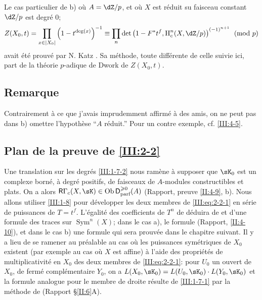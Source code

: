Le cas particulier de b) où $A=\dZ/p$, et où $X$ est réduit su faisceau 
constant $\dZ/p$ est degré $0$;
\[
  Z(X_0,t) = \prod_{x\in |X_0|} \left(1-t^{\deg(x)}\right)^{-1}
      \equiv \prod_n \det\left(1-F^* t^f,\h_c^n(X,\dZ/p)\right)^{(-1)^{n+1}} \pmod p
\]
avait été prouvé par N. Katz \cite[XXII 3.1]{sga7}. Sa méthode, toute 
différente de celle suivie ici, part de la théorie $p$-adique de Dwork de 
$Z(X_0,t)$. 





\subsection{Remarque}\label{III:2-7}


Contrairement à ce que j'avais imprudemment affirmé à des amis, on ne 
peut pas dans b) omettre l'hypothèse ``$A$ réduit.'' Pour un contre 
exemple, cf. \ref{III:4-5}. 





\subsection{Plan de la preuve de \ref{III:2-2}}\label{III:2-8}

Une translation sur les degrés \ref{III:1-7-2} nous ramène à supposer 
que $\sK_0$ est un complexe borné, à degré positifs, de faisceaux de 
$A$-modules constructibles et plats. On a alors 
$\R\Gamma_c(X,\sK)\in \ob\D_\text{parf}^{\geqslant 0}(A)$ (Rapport, 
preuve \ref{II:4-9}, b). Nous allons utiliser \ref{III:1-8} pour développer 
les deux membres de \eqref{III:eq:2-2-1} en série de puissances de $T=t^f$. 
L'égalité des coefficients de $T^n$ de déduira de 
\cite[XVII 5.5.21]{sga4} et d'une formule des traces sur 
$\operatorname{Sym}^n(X)$; dans le cas a), le formule (Rapport, 
\ref{II:4-10}), et dans le cas b) une formule qui sera prouvée dans le 
chapitre suivant. Il y a lieu de se ramener au préalable au cas où les 
puissances symétriques de $X_0$ existent (par exemple au cas où $X$ est 
affine) à l'aide des propriétés de multiplicativité en $X_0$ des deux 
membres de \eqref{III:eq:2-2-1}: pour $U_0$ un ouvert de $X_0$, de fermé 
complémentaire $Y_0$, on a $L(X_0,\sK_0)=L(U_0,\sK_0)\cdot L(Y_0,\sK_0)$ et 
la formule analogue pour le membre de droite résulte de \ref{III:1-7-1} 
par la méthode de (Rapport \S\ref{II:6}A). 






